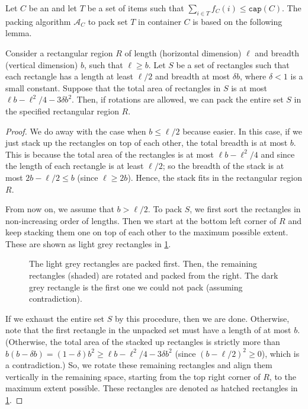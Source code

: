 Let $C$ be an \LContainer{} and let $T$ be a set of items such that $\sum_{i\in T}f_C(i)\le \mathtt{cap}(C)$.
The packing algorithm $\mathcal A_C$ to pack set $T$ in container $C$ is based on the following lemma.
\begin{lemma}
\label{pack-sheets}
Consider a rectangular region $R$ of length (horizontal dimension) $\ell$ and breadth (vertical dimension) $b$, such that $\ell\ge b$.
Let $S$ be a set of rectangles such that each rectangle has a length at least $\ell/2$ and breadth at most $\delta b$, where $\delta<1$ is a small constant. Suppose that the total area of rectangles in $S$ is at most $\ell b-\ell^2/4-3\delta b^2$.
Then, if rotations are allowed, we can pack the entire set $S$ in the specified rectangular region $R$.
\end{lemma}
\begin{proof}
We do away with the case when $b\le \ell/2$ because  easier. In this case, if we just stack up the rectangles on top of each other,
the total breadth is at most $b$. This is because the total area of the rectangles is at most $\ell b-\ell^2/4$ and
since the length of each rectangle is at least $\ell/2$; so the breadth of the stack is at most $2b-\ell/2\le b$ (since $\ell \ge 2b$).
Hence, the stack fits in the rectangular region $R$.

From now on, we assume that $b>\ell/2$. To pack $S$, we first sort the rectangles in non-increasing order of lengths. 
Then we start at the bottom left corner of $R$ and keep stacking them
one on top of each other to the maximum possible extent. These are shown as light grey rectangles in \cref{fig:stack-up}.
\begin{figure}[ht]
\begin{center}

\end{center}
\caption{The light grey rectangles are packed first. Then, the remaining rectangles (shaded) are rotated and packed from the right. The dark grey rectangle is the first one we could not pack (assuming contradiction).}
\label{fig:stack-up}
\end{figure}

If we exhaust the entire set $S$ by this procedure, then we are done. Otherwise, note that the first rectangle in the unpacked set must have a length of at most $b$. (Otherwise,
the total area of the stacked up rectangles is strictly more than $b(b-\delta b)=(1-\delta)b^2\ge \ell b-\ell^2/4-3\delta b^2$ (since $(b-\ell/2)^2\ge 0$), which is a contradiction.)
So, we rotate these remaining rectangles and align them vertically in the remaining space, starting from the top right corner of $R$, to the maximum extent possible.
These rectangles are denoted as hatched rectangles in \cref{fig:stack-up}.
% 


\end{proof}
